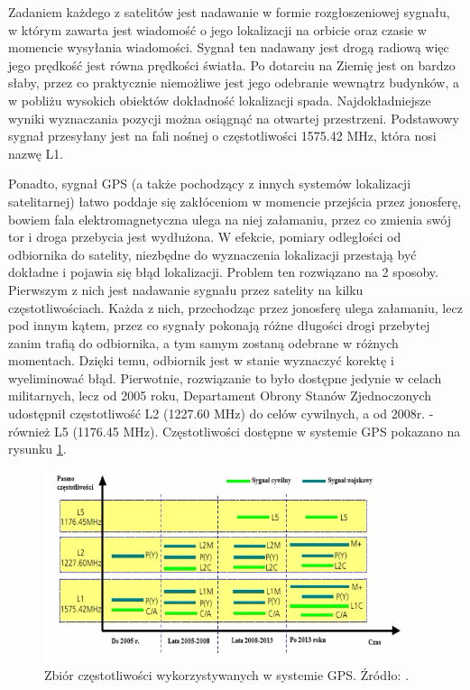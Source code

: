 Zadaniem każdego z satelitów jest nadawanie w formie rozgłoszeniowej sygnału, w którym zawarta jest wiadomość o jego lokalizacji na orbicie oraz czasie w momencie wysyłania wiadomości. Sygnał ten nadawany jest drogą radiową więc jego prędkość jest równa prędkości światła. Po dotarciu na Ziemię jest on bardzo słaby, przez co praktycznie niemożliwe jest jego odebranie wewnątrz budynków, a w pobliżu wysokich obiektów dokładność lokalizacji spada. Najdokładniejsze wyniki wyznaczania pozycji można osiągnąć na otwartej przestrzeni. Podstawowy sygnał przesyłany jest na fali nośnej o częstotliwości 1575.42 MHz, która nosi nazwę L1.

Ponadto, sygnał GPS (a także pochodzący z innych systemów lokalizacji satelitarnej)  łatwo poddaje się zakłóceniom w momencie przejścia przez jonosferę, bowiem fala elektromagnetyczna ulega na niej załamaniu, przez co zmienia swój tor i droga przebycia jest wydłużona. W efekcie, pomiary odległości od odbiornika do satelity, niezbędne do wyznaczenia lokalizacji przestają być dokładne i pojawia się błąd lokalizacji.
Problem ten rozwiązano na 2 sposoby. Pierwszym z nich jest nadawanie sygnału przez satelity na kilku częstotliwościach. Każda z nich, przechodząc przez jonosferę ulega załamaniu, lecz pod innym kątem, przez co sygnały pokonają różne długości drogi przebytej zanim trafią do odbiornika, a tym samym zostaną odebrane w różnych momentach. Dzięki temu, odbiornik jest w stanie wyznaczyć korektę i wyeliminować błąd. Pierwotnie, rozwiązanie to było dostępne jedynie w celach militarnych, lecz od 2005 roku, Departament Obrony Stanów Zjednoczonych udostępnił częstotliwość L2 (1227.60 MHz) do celów cywilnych, a od 2008r. - również L5 (1176.45 MHz). Częstotliwości dostępne w systemie GPS pokazano na rysunku \ref{fig:image_gps_frequencies}.

\begin{figure}[H]
	\centering
	\includegraphics[width=15cm]{img/theory/GPS/gps_frequencies.png}
	\caption{Zbiór częstotliwości wykorzystywanych w systemie GPS. Źródło: \cite{inzynierka}.}
	\label{fig:image_gps_frequencies}
\end{figure}

